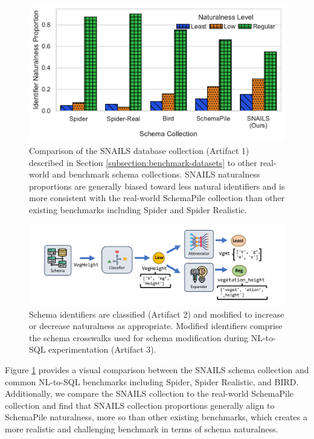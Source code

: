 \begin{figure}
  \centering
  \includegraphics[width=\figwidthmod\linewidth]{figures/benchmark_naturalness_compare.pdf}
  \caption{Comparison of the SNAILS database collection (Artifact 1) described in Section \ref{subsection:benchmark-datasets} to other real-world and benchmark schema collections. SNAILS naturalness proportions are generally biased toward less natural identifiers and is more consistent with the real-world SchemaPile collection than other existing benchmarks including Spider and Spider Realistic.}
  \label{fig:naturalnesscompare}
\end{figure}

\begin{figure}
    \centering
    \includegraphics[width=\linewidth]{figures/classify-modify-pipeline.pdf}
    \caption{Schema identifiers are classified (Artifact 2) and modified to increase or decrease naturalness as appropriate. Modified identifiers comprise the schema crosswalks used for schema modification during NL-to-SQL experimentation (Artifact 3).}
    \label{fig:classify-modify-pipeline-main}
\end{figure}

Figure \ref{fig:naturalnesscompare} provides a visual comparison between the SNAILS schema collection and common NL-to-SQL benchmarks including Spider, Spider Realistic, and BIRD.
Additionally, we compare the SNAILS collection to the real-world SchemaPile collection and find that SNAILS collection proportions generally align to SchemaPile naturalness, more so than other existing benchmarks, which creates a more realistic and challenging benchmark in terms of schema naturalness.

